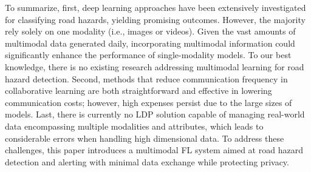To summarize, first, deep learning approaches have been extensively investigated for classifying road hazards, yielding promising outcomes. However, the majority rely solely on one modality (i.e., images or videos). Given the vast amounts of multimodal data generated daily, incorporating multimodal information could significantly enhance the performance of single-modality models. To our best knowledge, there is no existing research addressing multimodal learning for road hazard detection. Second, methods that reduce communication frequency in collaborative learning are both straightforward and effective in lowering communication costs; however, high expenses persist due to the large sizes of models. Last, there is currently no LDP solution capable of managing real-world data encompassing multiple modalities and attributes, which leads to considerable errors when handling high dimensional data. To address these challenges, this paper introduces a multimodal FL system aimed at road hazard detection and alerting with minimal data exchange while protecting privacy.